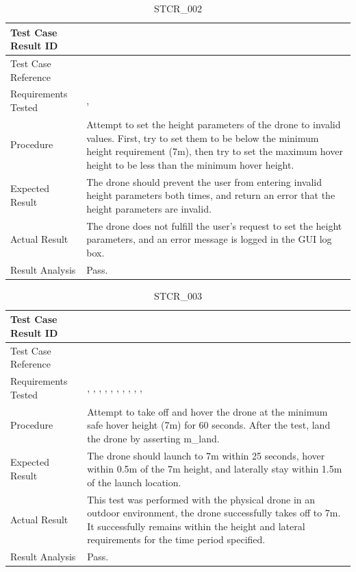 \documentclass[12pt, titlepage]{article}
\begin{document}
\begin{table}[!h]
\begin{center}
\caption {STCR\_002}
\label{tab:STCR_002}
\begin{tabular}{ | m{3.2cm} | m{12.2cm} | } 
\hline
Test Case Result ID & \nameref{tab:STCR_002} \\ 
\hline
Test Case Reference & \nameref{tab:STC_002}  \\ 
\hline
Requirements Tested & \nameref{SAFE_002}, \nameref{GEN_004} \\ 
\hline
Procedure & Attempt to set the height parameters of the drone to invalid values. First, try to set them to be below the minimum height requirement (7m), then try to set the maximum hover height to be less than the minimum hover height.  \\ 
\hline
Expected Result & The drone should prevent the user from entering invalid height parameters both times, and return an error that the height parameters are invalid.   \\ 
\hline
Actual Result & The drone does not fulfill the user's request to set the height parameters, and an error message is logged in the GUI log box.  \\ 
\hline
Result Analysis & Pass.  \\ 
\hline
\end{tabular}
\end{center}
\end{table}




\begin{table}[!h]
\begin{center}
\caption {STCR\_003}
\label{tab:STCR_003}
\begin{tabular}{ | m{3.2cm} | m{12.2cm} | } 
\hline
Test Case Result ID & \nameref{tab:STCR_003} \\ 
\hline
Test Case Reference & \nameref{tab:STC_003}  \\ 
\hline
Requirements Tested & \nameref{GEN_003}, \nameref{GEN_004}, \nameref{STA_000}, \nameref{STA_001}, \nameref{STA_004}, \nameref{STA_005}, \nameref{STA_006}, \nameref{TRANS_002}, \nameref{TRANS_003}, \nameref{TRANS_009}, \nameref{PERF_002} \\ 
\hline
Procedure & Attempt to take off and hover the drone at the minimum safe hover height (7m) for 60 seconds. After the test, land the drone by asserting m\_land. \\ 
\hline
Expected Result & The drone should launch to 7m within 25 seconds, hover within 0.5m of the 7m height, and laterally stay within 1.5m of the launch location.   \\ 
\hline
Actual Result & This test was performed with the physical drone in an outdoor environment, the drone successfully takes off to 7m. It successfully remains within the height and lateral requirements for the time period specified.   \\ 
\hline
Result Analysis & Pass.   \\ 
\hline
\end{tabular}
\end{center}
\end{table}
\end{document}
